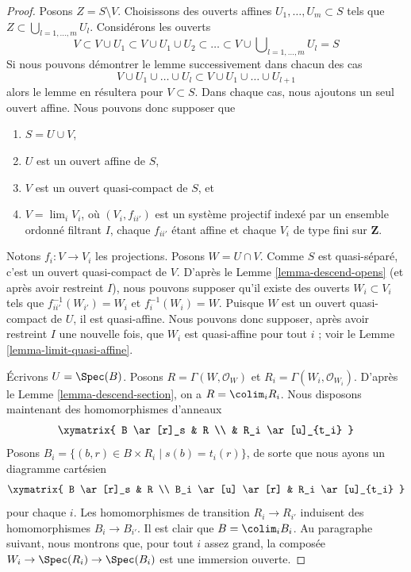 \begin{proof}
Posons $Z = S \setminus V$. Choisissons des ouverts affines
$U_1, \ldots, U_m \subset S$ tels que
$Z \subset \bigcup_{l = 1, \ldots, m} U_l$. Considérons les ouverts
$$
V \subset V \cup U_1 \subset V \cup U_1 \cup U_2 \subset
\ldots \subset V \cup \bigcup\nolimits_{l = 1, \ldots, m} U_l = S
$$
Si nous pouvons démontrer le lemme successivement dans chacun des cas
$$
V \cup U_1 \cup \ldots \cup U_l
\subset
V \cup U_1 \cup \ldots \cup U_{l + 1}
$$
alors le lemme en résultera pour $V \subset S$. Dans chaque cas, nous
ajoutons un seul ouvert affine. Nous pouvons donc supposer que
\begin{enumerate}
\item $S = U \cup V$,
\item $U$ est un ouvert affine de $S$,
\item $V$ est un ouvert quasi-compact de $S$, et
\item $V = \lim_i V_i$, où $(V_i, f_{ii'})$ est un système projectif indexé
par un ensemble ordonné filtrant $I$, chaque $f_{ii'}$ étant affine et
chaque $V_i$ de type fini sur $\mathbf{Z}$.
\end{enumerate}
Notons $f_i : V \to V_i$ les projections. Posons $W = U \cap V$. Comme $S$
est quasi-séparé, c'est un ouvert quasi-compact de $V$. D'après le
Lemme \ref{lemma-descend-opens} (et après avoir restreint $I$), nous pouvons
supposer qu'il existe des ouverts $W_i \subset V_i$ tels que
$f_{ii'}^{-1}(W_{i'}) = W_i$ et $f_i^{-1}(W_i) = W$. Puisque $W$ est un
ouvert quasi-compact de $U$, il est quasi-affine. Nous pouvons donc supposer,
après avoir restreint $I$ une nouvelle fois, que $W_i$ est quasi-affine pour
tout $i$ ; voir le Lemme \ref{lemma-limit-quasi-affine}.

\medskip\noindent
Écrivons $U = \Spec(B)$. Posons $R = \Gamma(W, \mathcal{O}_W)$ et
$R_i = \Gamma(W_i, \mathcal{O}_{W_i})$. D'après le
Lemme \ref{lemma-descend-section}, on a $R = \colim_i R_i$. Nous disposons
maintenant des homomorphismes d'anneaux
$$
\xymatrix{
B \ar[r]_s & R \\
& R_i \ar[u]_{t_i}
}
$$
Posons $B_i = \{(b, r) \in B \times R_i \mid s(b) = t_i(r)\}$, de sorte que
nous ayons un diagramme cartésien
$$
\xymatrix{
B \ar[r]_s & R \\
B_i \ar[u] \ar[r] & R_i \ar[u]_{t_i}
}
$$
pour chaque $i$. Les homomorphismes de transition $R_i \to R_{i'}$
induisent des homomorphismes $B_i \to B_{i'}$. Il est clair que
$B = \colim_i B_i$. Au paragraphe suivant, nous montrons que, pour tout $i$
assez grand, la composée $W_i \to \Spec(R_i) \to \Spec(B_i)$ est une
immersion ouverte.


\end{proof}
